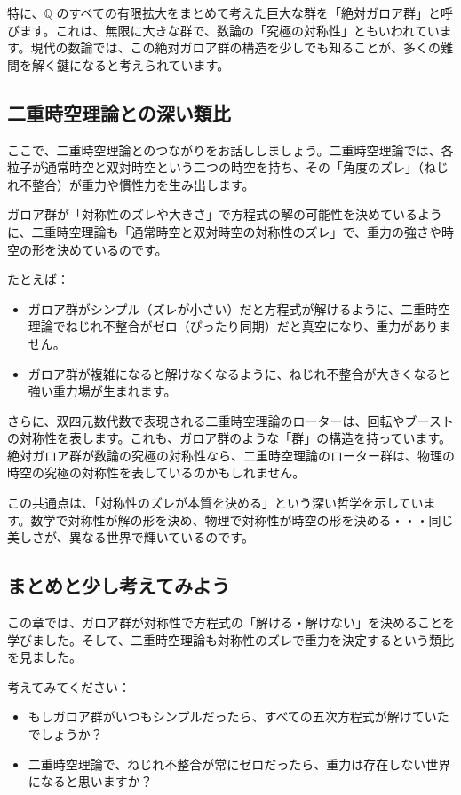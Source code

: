 \documentclass[dvipdfmx,12pt,a4paper]{jsarticle}
\begin{document}
特に、$\mathbb{Q}$ のすべての有限拡大をまとめて考えた巨大な群を「絶対ガロア群」と呼びます。これは、無限に大きな群で、数論の「究極の対称性」ともいわれています。現代の数論では、この絶対ガロア群の構造を少しでも知ることが、多くの難問を解く鍵になると考えられています。

\subsection{二重時空理論との深い類比}

ここで、二重時空理論とのつながりをお話ししましょう。二重時空理論では、各粒子が通常時空と双対時空という二つの時空を持ち、その「角度のズレ」（ねじれ不整合）が重力や慣性力を生み出します。

ガロア群が「対称性のズレや大きさ」で方程式の解の可能性を決めているように、二重時空理論も「通常時空と双対時空の対称性のズレ」で、重力の強さや時空の形を決めているのです。

たとえば：

\begin{itemize}
  \item ガロア群がシンプル（ズレが小さい）だと方程式が解けるように、二重時空理論でねじれ不整合がゼロ（ぴったり同期）だと真空になり、重力がありません。
  \item ガロア群が複雑になると解けなくなるように、ねじれ不整合が大きくなると強い重力場が生まれます。
\end{itemize}

さらに、双四元数代数で表現される二重時空理論のローターは、回転やブーストの対称性を表します。これも、ガロア群のような「群」の構造を持っています。絶対ガロア群が数論の究極の対称性なら、二重時空理論のローター群は、物理の時空の究極の対称性を表しているのかもしれません。

この共通点は、「対称性のズレが本質を決める」という深い哲学を示しています。数学で対称性が解の形を決め、物理で対称性が時空の形を決める・・・同じ美しさが、異なる世界で輝いているのです。

\subsection{まとめと少し考えてみよう}

この章では、ガロア群が対称性で方程式の「解ける・解けない」を決めることを学びました。そして、二重時空理論も対称性のズレで重力を決定するという類比を見ました。

考えてみてください：
\begin{itemize}
  \item もしガロア群がいつもシンプルだったら、すべての五次方程式が解けていたでしょうか？
  \item 二重時空理論で、ねじれ不整合が常にゼロだったら、重力は存在しない世界になると思いますか？
\end{itemize}
\end{document}
